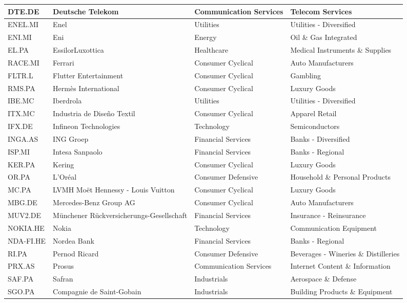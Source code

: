 \begin{longtable}{|p{2cm}|p{3cm}|p{4cm}|p{4cm}|}
DTE.DE & Deutsche Telekom & Communication Services & Telecom Services \\ \hline
ENEL.MI & Enel & Utilities & Utilities - Diversified \\ \hline
ENI.MI & Eni & Energy & Oil \& Gas Integrated \\ \hline
EL.PA & EssilorLuxottica & Healthcare & Medical Instruments \& Supplies \\ \hline
RACE.MI & Ferrari & Consumer Cyclical & Auto Manufacturers \\ \hline
FLTR.L & Flutter Entertainment & Consumer Cyclical & Gambling \\ \hline
RMS.PA & Hermès International & Consumer Cyclical & Luxury Goods \\ \hline
IBE.MC & Iberdrola & Utilities & Utilities - Diversified \\ \hline
ITX.MC & Industria de Diseño Textil & Consumer Cyclical & Apparel Retail \\ \hline
IFX.DE & Infineon Technologies & Technology & Semiconductors \\ \hline
INGA.AS & ING Groep & Financial Services & Banks - Diversified \\ \hline
ISP.MI & Intesa Sanpaolo & Financial Services & Banks - Regional \\ \hline
KER.PA & Kering & Consumer Cyclical & Luxury Goods \\ \hline
OR.PA & L'Oréal & Consumer Defensive & Household \& Personal Products \\ \hline
MC.PA & LVMH Moët Hennessy - Louis Vuitton & Consumer Cyclical & Luxury Goods \\ \hline
MBG.DE & Mercedes-Benz Group AG & Consumer Cyclical & Auto Manufacturers \\ \hline
MUV2.DE & Münchener Rückversicherungs-Gesellschaft & Financial Services & Insurance - Reinsurance \\ \hline
NOKIA.HE & Nokia & Technology & Communication Equipment \\ \hline
NDA-FI.HE & Nordea Bank & Financial Services & Banks - Regional \\ \hline
RI.PA & Pernod Ricard & Consumer Defensive & Beverages - Wineries \& Distilleries \\ \hline
PRX.AS & Prosus & Communication Services & Internet Content \& Information \\ \hline
SAF.PA & Safran & Industrials & Aerospace \& Defense \\ \hline
SGO.PA & Compagnie de Saint-Gobain & Industrials & Building Products \& Equipment \\ \hline

\end{longtable}

